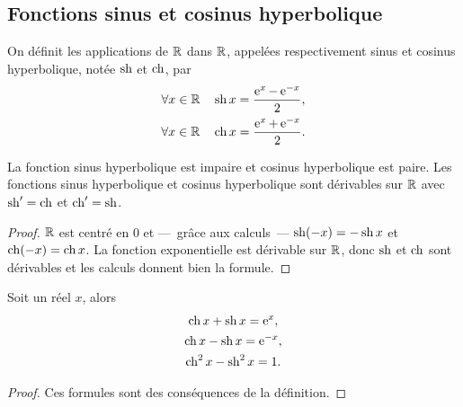 \subsection{Fonctions sinus et cosinus hyperbolique}
\label{subsec:chap1-sinushetcosh}
\begin{defdef} 
  On définit les applications de $\mathbb{R}$ dans $\mathbb{R}$, appelées respectivement sinus et cosinus hyperbolique, notée $\operatorname{sh}$ et $\operatorname{ch}$, par 
  \begin{gather} 
    \forall x \in \mathbb{R} \quad \operatorname{sh} x = \frac{\operatorname{e}^x - \operatorname{e}^{-x}}{2}, \\
    \forall x \in \mathbb{R} \quad \operatorname{ch} x = \frac{\operatorname{e}^x + \operatorname{e}^{-x}}{2}.
  \end{gather}
\end{defdef}
%
\begin{prop} 
  La fonction sinus hyperbolique est impaire et cosinus hyperbolique est paire. Les fonctions sinus hyperbolique et cosinus hyperbolique sont dérivables sur $\mathbb{R}$ avec $\operatorname{sh}'=\operatorname{ch}$ et $\operatorname{ch}'=\operatorname{sh}$. 
\end{prop}
\begin{proof} 
  $\mathbb{R}$ est centré en $0$ et ---~grâce aux calculs~--- $\operatorname{sh}(-x)=-\operatorname{sh} x$ et $\operatorname{ch}(-x)=\operatorname{ch} x$. La fonction exponentielle est dérivable sur $\mathbb{R}$, donc $\operatorname{sh}$ et $\operatorname{ch}$ sont dérivables et les calculs donnent bien la formule.
\end{proof}
%
\begin{prop} Soit un réel $x$, alors
\begin{gather} 
  \operatorname{ch} x + \operatorname{sh} x = \operatorname{e}^x, \\ 
  \operatorname{ch} x - \operatorname{sh} x = \operatorname{e}^{-x}, \\ 
  \operatorname{ch}^2 x - \operatorname{sh}^2 x = 1.
\end{gather}
\end{prop}
\begin{proof} 
  Ces formules sont des conséquences de la définition.
\end{proof}
%
